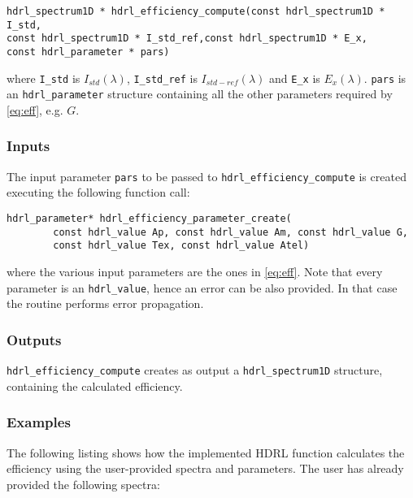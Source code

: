 \begin{lstlisting}
hdrl_spectrum1D * hdrl_efficiency_compute(const hdrl_spectrum1D * I_std,
const hdrl_spectrum1D * I_std_ref,const hdrl_spectrum1D * E_x,
const hdrl_parameter * pars)
\end{lstlisting}
where \verb+I_std+ is $I_{std}(\lambda)$, \verb+I_std_ref+ is $I_{std-ref}(\lambda)$ and \verb+E_x+ is $E_x(\lambda)$. \verb+pars+ is an \verb+hdrl_parameter+ structure containing all the other parameters required by \ref{eq:eff}, e.g. $G$.

\subsubsection{Inputs}
\label{sec:algorithms:efficiency:inputs}
The input parameter \verb+pars+ to be passed to \verb+hdrl_efficiency_compute+ is created executing the following function call:
\begin{lstlisting}
hdrl_parameter* hdrl_efficiency_parameter_create(
        const hdrl_value Ap, const hdrl_value Am, const hdrl_value G,
        const hdrl_value Tex, const hdrl_value Atel)
\end{lstlisting}
where the various input parameters are the ones in \ref{eq:eff}. Note that every parameter is an \verb+hdrl_value+, hence an error can be also provided. In that case the routine performs error propagation.

\subsubsection{Outputs}
\verb+hdrl_efficiency_compute+ creates as output a \verb+hdrl_spectrum1D+ structure, containing the calculated efficiency.

\subsubsection{Examples}
The following listing shows how the implemented HDRL function calculates the efficiency using the user-provided spectra and parameters.
The user has already provided the following spectra:

